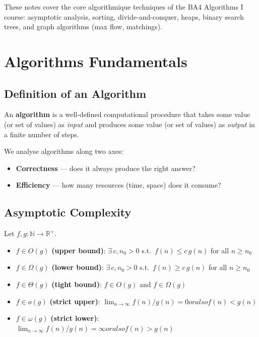 \documentclass[11pt,a4paper,openany]{book}
\begin{document}
\raggedbottom


\tableofcontents
\clearpage

These notes cover the core algorithmique techniques of the BA4 Algorithms I course:
asymptotic analysis, sorting, divide-and-conquer, heaps, binary search trees, and
graph algorithms (max flow, matchings).

\chapter{Algorithms Fundamentals}

\section{Definition of an Algorithm}
\begin{defnbox}
An \textbf{algorithm} is a well-defined computational procedure that takes some value (or
set of values) as \emph{input} and produces some value (or set of values) as \emph{output}
in a finite number of steps.
\end{defnbox}

We analyse algorithms along two axes:
\begin{itemize}
  \item \textbf{Correctness} — does it always produce the right answer?
  \item \textbf{Efficiency} — how many resources (time, space) does it consume?
\end{itemize}

\section{Asymptotic Complexity}

\begin{defnbox}[title=Asymptotic notations]
Let $f, g : \mathbb{N} \to \mathbb{R}^+$.
\begin{itemize}
  \item $f \in O(g)$ \textbf{(upper bound)}: $\exists\, c, n_0 > 0$ s.t.\ $f(n) \leq c\,g(n)$ for all $n \geq n_0$
  \item $f \in \Omega(g)$ \textbf{(lower bound)}: $\exists\, c, n_0 > 0$ s.t.\ $f(n) \geq c\,g(n)$ for all $n \geq n_0$
  \item $f \in \Theta(g)$ \textbf{(tight bound)}: $f \in O(g)$ and $f \in \Omega(g)$
  \item $f \in o(g)$ \textbf{(strict upper)}: $\lim_{n\to\infty} f(n)/g(n) = 0 or also f(n) < g(n)$
  \item $f \in \omega(g)$ \textbf{(strict lower)}: $\lim_{n\to\infty} f(n)/g(n) = \infty or also f(n) > g(n)$
\end{itemize}
\end{defnbox}
\end{document}
